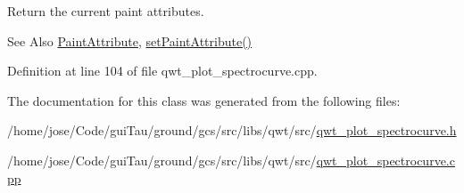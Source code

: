 Return the current paint attributes. 

\begin{DoxySeeAlso}{See Also}
\hyperlink{class_qwt_plot_spectro_curve_af6d4c6ae392f3f521db710484a059625}{Paint\-Attribute}, \hyperlink{class_qwt_plot_spectro_curve_a3a2ddc8e46bc4414b5ce104e7c70f9b4}{set\-Paint\-Attribute()} 
\end{DoxySeeAlso}


Definition at line 104 of file qwt\-\_\-plot\-\_\-spectrocurve.\-cpp.



The documentation for this class was generated from the following files\-:\begin{DoxyCompactItemize}
\item 
/home/jose/\-Code/gui\-Tau/ground/gcs/src/libs/qwt/src/\hyperlink{qwt__plot__spectrocurve_8h}{qwt\-\_\-plot\-\_\-spectrocurve.\-h}\item 
/home/jose/\-Code/gui\-Tau/ground/gcs/src/libs/qwt/src/\hyperlink{qwt__plot__spectrocurve_8cpp}{qwt\-\_\-plot\-\_\-spectrocurve.\-cpp}\end{DoxyCompactItemize}
